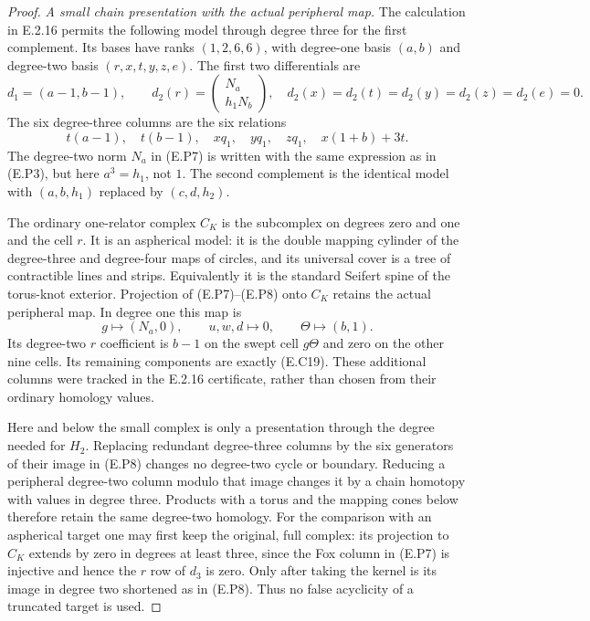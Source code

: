 \begin{proof}
\emph{A small chain presentation with the actual peripheral map.}
The calculation in E.2.16 permits the following model
through degree three for the first complement. Its
bases have ranks $(1,2,6,6)$, with degree-one basis
$(a,b)$ and degree-two basis $(r,x,t,y,z,e)$.
The first two differentials are
\[
 d_1=(a-1,b-1),\qquad
 d_2(r)=\begin{pmatrix}N_a\\h_1N_b\end{pmatrix},
 \quad d_2(x)=d_2(t)=d_2(y)=d_2(z)=d_2(e)=0.
 \tag{E.P7}
\]
The six degree-three columns are the six relations
\[
 t(a-1),\quad t(b-1),\quad xq_1,\quad yq_1,\quad zq_1,
                         \quad x(1+b)+3t.
 \tag{E.P8}
\]
The degree-two norm $N_a$ in (E.P7) is written with
the same expression as in (E.P3), but here $a^3=h_1$,
not $1$. The second complement is the identical
model with $(a,b,h_1)$ replaced by $(c,d,h_2)$.

The ordinary one-relator complex $C_K$ is the subcomplex
on degrees zero and one and the cell $r$. It is an
aspherical model: it is the double mapping cylinder
of the degree-three and degree-four maps of circles,
and its universal cover is a tree of contractible
lines and strips. Equivalently it is the standard
Seifert spine of the torus-knot exterior. Projection
of (E.P7)--(E.P8) onto $C_K$ retains the actual
peripheral map. In degree one this map is
\[
 g\longmapsto(N_a,0),\qquad
 u,w,d\longmapsto0,\qquad
 \Theta\longmapsto(b,1).
 \tag{E.P9}
\]
Its degree-two $r$ coefficient is $b-1$ on the swept
cell $g\Theta$ and zero on the other nine cells.
Its remaining components are exactly (E.C19).
These additional columns were tracked in the
E.2.16 certificate, rather than chosen from their
ordinary homology values.

Here and below the small complex is only a
presentation through the degree needed for $H_2$.
Replacing redundant degree-three columns by the six
generators of their image in (E.P8) changes no
degree-two cycle or boundary. Reducing a peripheral
degree-two column modulo that image changes it by
a chain homotopy with values in degree three.
Products with a torus and the mapping cones below
therefore retain the same degree-two homology.
For the comparison with an aspherical target one
may first keep the original, full complex: its
projection to $C_K$ extends by zero in degrees at
least three, since the Fox column in (E.P7) is
injective and hence the $r$ row of $d_3$ is zero.
Only after taking the kernel is its image in degree
two shortened as in (E.P8). Thus no false
acyclicity of a truncated target is used.


\end{proof}
